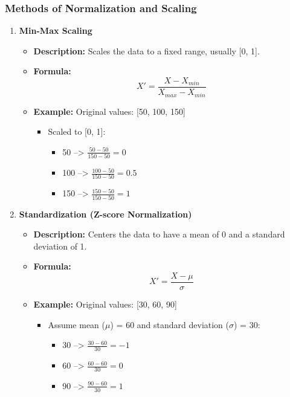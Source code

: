 \documentclass[aspectratio=169]{beamer}
\begin{document}
\begin{frame}[fragile]
    \frametitle{Methods of Normalization and Scaling}
    \begin{enumerate}
        \item \textbf{Min-Max Scaling}
        \begin{itemize}
            \item \textbf{Description:} Scales the data to a fixed range, usually [0, 1].
            \item \textbf{Formula:}
            \begin{equation}
                X' = \frac{X - X_{min}}{X_{max} - X_{min}}
            \end{equation}
            \item \textbf{Example:} Original values: [50, 100, 150]
            \begin{itemize}
                \item Scaled to [0, 1]:
                \begin{itemize}
                    \item 50 --> \( \frac{50 - 50}{150 - 50} = 0 \)
                    \item 100 --> \( \frac{100 - 50}{150 - 50} = 0.5 \)
                    \item 150 --> \( \frac{150 - 50}{150 - 50} = 1 \)
                \end{itemize}
            \end{itemize}
        \end{itemize}

        \item \textbf{Standardization (Z-score Normalization)}
        \begin{itemize}
            \item \textbf{Description:} Centers the data to have a mean of 0 and a standard deviation of 1.
            \item \textbf{Formula:}
            \begin{equation}
                X' = \frac{X - \mu}{\sigma}
            \end{equation}
            \item \textbf{Example:} Original values: [30, 60, 90]
            \begin{itemize}
                \item Assume mean (\(\mu\)) = 60 and standard deviation (\(\sigma\)) = 30:
                \begin{itemize}
                    \item 30 --> \( \frac{30 - 60}{30} = -1 \)
                    \item 60 --> \( \frac{60 - 60}{30} = 0 \)
                    \item 90 --> \( \frac{90 - 60}{30} = 1 \)
                \end{itemize}
            \end{itemize}
        \end{itemize}
    \end{enumerate}
\end{frame}
\end{document}
